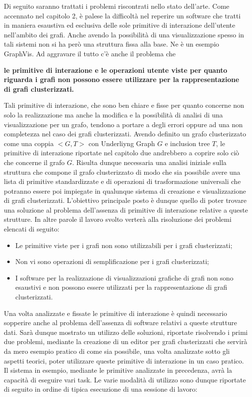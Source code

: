 \large{
Di seguito saranno trattati i problemi riscontrati nello stato dell'arte.
Come accennato nel capitolo 2, è palese la difficoltà nel reperire un software che tratti in maniera esaustiva ed esclusiva delle sole primitive di interazione dell'utente nell'ambito dei grafi. Anche avendo la possibilità di una visualizzazione spesso in tali sistemi non si ha però una struttura fissa alla base. Ne è un esempio GraphVis. 
Ad aggravare il tutto c'è anche il problema che
\begin{center}
\textbf{le primitive di interazione e le operazioni utente viste per quanto riguarda i grafi non possono essere utilizzare per la rappresentazione di grafi clusterizzati.}
\end{center}
Tali primitive di interazione, che sono ben chiare e fisse per quanto concerne non solo la realizzazione ma anche la modifica e la possibilità di analisi di una visualizzazione per un grafo, tendono a portare a degli errori oppure ad una non completezza nel caso dei grafi clusterizzati.
Avendo definito un grafo clusterizzato come una coppia $<G,T>$ con Underliyng Graph $G$ e inclusion tree $T$, le primitive di interazione riportate nel capitolo due andrebbero a coprire solo ciò che concerne il grafo $G$.
Risulta dunque necessaria una analisi iniziale sulla struttura che compone il grafo clusterizzato di modo che sia possibile avere una lista di primitive standardizzate e di operazioni di trasformazione universali che potranno essere poi impiegate in qualunque sistema di creazione e visualizzazione di grafi clusterizzati.
L'obiettivo principale posto è dunque quello di poter trovare una soluzione al problema dell'assenza di primitive di interazione relative a queste strutture.
In altre parole il lavoro svolto verterà alla risoluzione dei problemi elencati di seguito:
\begin{itemize}
	\item Le primitive viste per i grafi non sono utilizzabili per i grafi clusterizzati;
	\item Non vi sono operazioni di semplificazione per i grafi clusterizzati;
	\item I software per la realizzazione di visualizzazioni grafiche di grafi non sono esaustivi e non possono essere utilizzati per la rappresentazione di grafi clusterizzati.
\end{itemize}
Una volta analizzate e fissate le primitive di interazione è quindi necessario sopperire anche al problema dell'assenza di software relativi a queste strutture dati. 
Sarà dunque mostrato un utilizzo delle soluzioni, riportate risolvendo i primi due problemi, mediante la creazione di un editor per grafi clusterizzati che servirà da mero esempio pratico di come sia possibile, una volta analizzate sotto gli aspetti teorici, poter utilizzare queste primitive di interazione in un caso pratico. Il sistema in esempio, mediante le primitive analizzate in precedenza, avrà la capacità di eseguire vari task. Le varie modalità di utilizzo sono dunque riportate di seguito in ordine di tipica esecuzione di una sessione di lavoro:
}
